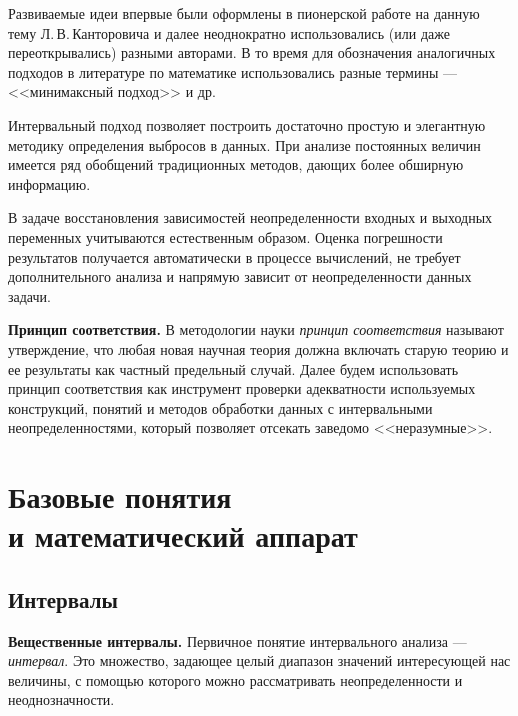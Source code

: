 \documentclass[a5paper,openany]{book}
\begin{document}
{{Развиваемые идеи впервые были оформлены в пионерской работе на данную тему
Л.\,В.\,Канторовича \cite{Kantorovich} и далее неоднократно использовались (или 
даже переоткрывались) разными авторами. 
В то время для обозначения  
аналогичных  подходов в литературе по математике использовались разные термины --- <<минимаксный подход>> и др. 

Интервальный подход позволяет построить достаточно простую и 
элегантную методику определения выбросов в данных. 
При анализе постоянных величин  имеется ряд обобщений традиционных методов, дающих более обширную информацию. 

В задаче восстановления зависимостей 
неопределенности входных и выходных переменных учитываются естественным образом. 
Оценка погрешности результатов получается автоматически в процессе вычислений, не требует дополнительного анализа и напрямую зависит от неопределенности 
данных задачи. 

{\bf Принцип соответствия.} 
В методологии науки \textit{принцип соответствия} называют утверждение, что любая 
новая научная теория должна включать старую теорию и ее результаты как частный 
предельный случай. 	Далее будем использовать принцип соответствия как инструмент проверки адекватности используемых конструкций, понятий и методов обработки данных с интервальными 
неопределенностями, который позволяет отсекать заведомо <<неразумные>>.


	\chapter[Базовые понятия и математический аппарат]%
{Базовые понятия\\ и  математический аппарат} 
\label{PrimaryConceptChap} 



	\section{Интервалы} 
\label{IntervalSect} 


{\bf Вещественные интервалы.} 
Первичное понятие интервального анализа --- \emph{интервал}. Это множество, задающее целый диапазон значений интересующей нас величины, с помощью 
которого можно рассматривать неопределенности и неоднозначности. 

}}
\end{document}
